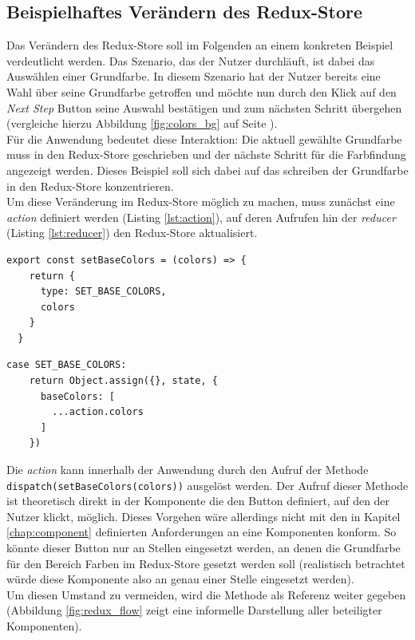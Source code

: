 \subsection{Beispielhaftes Verändern des Redux-Store}
Das Verändern des Redux-Store soll im Folgenden an einem konkreten Beispiel verdeutlicht werden. Das Szenario, das der Nutzer durchläuft, ist dabei das Auswählen einer Grundfarbe. In diesem Szenario hat der Nutzer bereits eine Wahl über seine Grundfarbe getroffen und möchte nun durch den Klick auf den \textit{Next Step} Button seine Auswahl bestätigen und zum nächsten Schritt übergehen (vergleiche hierzu Abbildung \ref{fig:colors_bg} auf Seite \pageref{fig:colors_bg}).\\
Für die Anwendung bedeutet diese Interaktion: Die aktuell gewählte Grundfarbe muss in den Redux-Store geschrieben\footnotemark{} und der nächste Schritt für die Farbfindung angezeigt werden. Dieses Beispiel soll sich dabei auf das schreiben der Grundfarbe in den Redux-Store konzentrieren.\\

Um diese Veränderung im Redux-Store möglich zu machen, muss zunächst eine \textit{action} definiert werden (Listing \ref{lst:action}), auf deren Aufrufen hin der \textit{reducer} (Listing \ref{lst:reducer}) den Redux-Store aktualisiert.


\begin{lstlisting}[caption={Definition der \textit{action} zum setzen der Grundfarben}, label=lst:action]
  export const setBaseColors = (colors) => {
    return {
      type: SET_BASE_COLORS,
      colors
    }
  }
\end{lstlisting}

\begin{lstlisting}[caption={Veränderung des Redux-Store beim Aufrauf der \textit{action} \texttt{setBaseColors}}, label=lst:reducer]
  case SET_BASE_COLORS:
    return Object.assign({}, state, {
      baseColors: [
        ...action.colors
      ]
    })
\end{lstlisting}

Die \textit{action} kann innerhalb der Anwendung durch den Aufruf der Methode \verb|dispatch(setBaseColors(colors))| ausgelöst werden. Der Aufruf dieser Methode ist theoretisch direkt in der Komponente die den Button definiert, auf den der Nutzer klickt, möglich. Dieses Vorgehen wäre allerdings nicht mit den in Kapitel \ref{chap:component} definierten Anforderungen an eine Komponenten konform. So könnte dieser Button nur an Stellen eingesetzt werden, an denen die Grundfarbe für den Bereich Farben im Redux-Store gesetzt werden soll (realistisch betrachtet würde diese Komponente also an genau einer Stelle eingesetzt werden).\\
Um diesen Umstand zu vermeiden, wird die Methode als Referenz weiter gegeben (Abbildung \ref{fig:redux_flow} zeigt eine informelle Darstellung aller beteiligter Komponenten).

